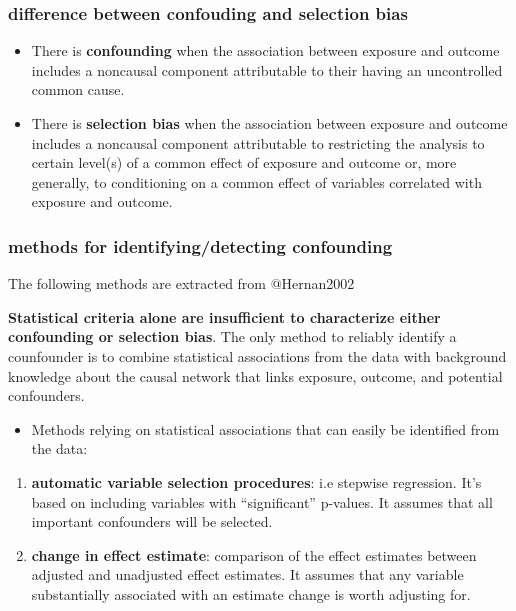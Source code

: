 \documentclass[
]{article}
\providecommand{\tightlist}{%
  \setlength{\itemsep}{0pt}\setlength{\parskip}{0pt}}
\begin{document}
\hypertarget{difference-between-confouding-and-selection-bias}{%
\subsubsection{difference between confouding and selection
bias}\label{difference-between-confouding-and-selection-bias}}

\begin{itemize}
\item
  There is \textbf{confounding} when the association between exposure
  and outcome includes a noncausal component attributable to their
  having an uncontrolled common cause.
\item
  There is \textbf{selection bias} when the association between exposure
  and outcome includes a noncausal component attributable to restricting
  the analysis to certain level(s) of a common effect of exposure and
  outcome or, more generally, to conditioning on a common effect of
  variables correlated with exposure and outcome.
\end{itemize}

\hypertarget{methods-for-identifyingdetecting-confounding}{%
\subsubsection{methods for identifying/detecting
confounding}\label{methods-for-identifyingdetecting-confounding}}

The following methods are extracted from @Hernan2002

\textbf{Statistical criteria alone are insufficient to characterize
either confounding or selection bias}. The only method to reliably
identify a counfounder is to combine statistical associations from the
data with background knowledge about the causal network that links
exposure, outcome, and potential confounders.

\begin{itemize}
\tightlist
\item
  Methods relying on statistical associations that can easily be
  identified from the data:
\end{itemize}

\begin{enumerate}
\def\labelenumi{\arabic{enumi}.}
\item
  \textbf{automatic variable selection procedures}: i.e stepwise
  regression. It's based on including variables with ``significant''
  p-values. It assumes that all important confounders will be selected.
\item
  \textbf{change in effect estimate}: comparison of the effect estimates
  between adjusted and unadjusted effect estimates. It assumes that any
  variable substantially associated with an estimate change is worth
  adjusting for.
\end{enumerate}
\end{document}
